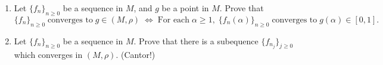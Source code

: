 \documentclass[11pt]{article}
\begin{document}
\begin{enumerate}
\begin{enumerate}[label=(\roman*)]
      \item Let \(\{f_n\}_{n \geq 0}\) be a sequence in \(M\), and \(g\) be a point in \(M\).  Prove that 
        \[\{f_n\}_{n \geq 0} \; \text{converges to} \; g \in (M,\rho) \;\Longleftrightarrow\;
        \text{For each}\; \alpha \geq 1, \; \{f_n(\alpha)\}_{n \geq 0} \;\text{converges to}\; g(\alpha) \in [0,1].
        \]
        
      \item Let \(\{f_n\}_{n \geq 0}\) be a sequence in \(M\).  Prove that there is a subequence 
        \(\{f_{n_j}\}_{j \geq 0}\) which converges in \((M, \rho)\). (Cantor!)
    \end{enumerate}

\end{enumerate}
\end{document}
